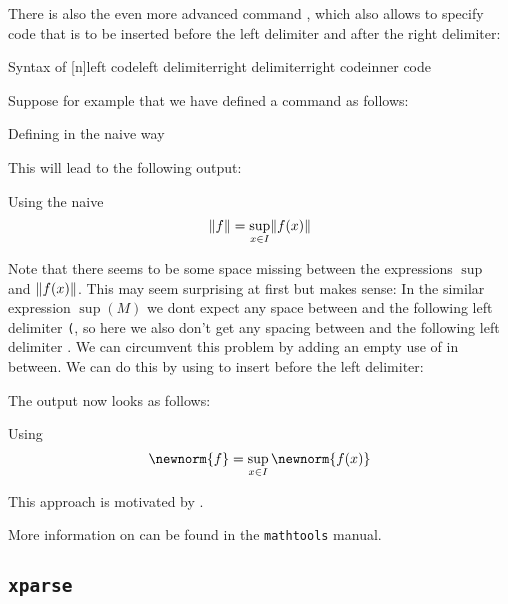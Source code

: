 There is also the even more advanced command , which also allows to specify code that is to be inserted before the left delimiter and after the right delimiter:
\begin{showcode}{Syntax of }
\DeclarePairedDelimiterXPP{\name}[n]{left code}{left delimiter}{right delimiter}{right code}{inner code}
\end{showcode}
Suppose for example that we have defined a command  as follows:
\begin{showcode}{Defining  in the naive way}
\DeclarePairedDelimiter{\norm}{\lVert}{\rVert}
\end{showcode}
This will lead to the following output:
\begin{showlatex}{Using the naive }
\[
  \norm{f}
  =
  \sup_{x \in I} \norm{f(x)}
\]
\end{showlatex}
Note that there seems to be some space missing between the expressions $\sup$ and $\norm{f(x)}$.
This may seem surprising at first but makes sense:
In the similar expression $\sup(M)$ we dont expect any space between  and the following left delimiter \texttt{(}, so here we also don’t get any spacing between  and the following left delimiter .
We can circumvent this problem by adding an empty use of  in between.
We can do this by using  to insert  before the left delimiter:
The output now looks as follows:
\begin{showlatex}{Using }
\[
  \newnorm{f}
  =
  \sup_{x \in I} \newnorm{f(x)}
\]
\end{showlatex}
This approach is motivated by \cite{tex_advancedpair}.

More information on  can be found in the \texttt{mathtools} manual.



\subsection{\texttt{xparse}}

